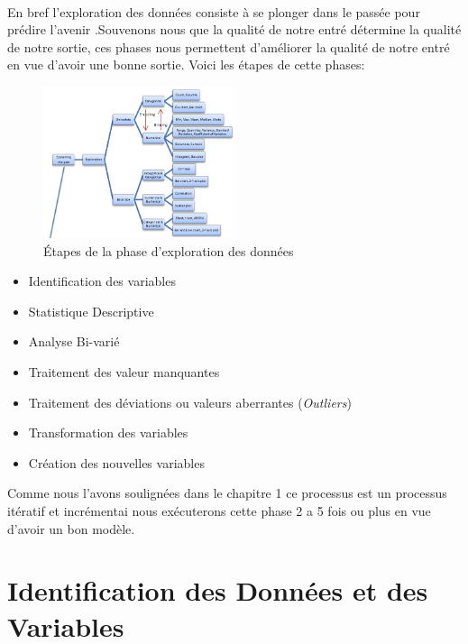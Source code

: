 \paragraph{}
En bref l'exploration des données consiste à se plonger dans le passée
pour prédire l'avenir .Souvenons nous que la qualité de notre entré
détermine la qualité de notre sortie, ces phases nous permettent
d'améliorer la qualité de notre entré en vue d'avoir une bonne sortie.
Voici les étapes de cette phases:
\begin{figure}[ht]
	\centering
	\includegraphics[width=0.5\textwidth]{fig/Exploration.png}
	\caption{Étapes de la phase d'exploration des données }
	\label{fig:imageExpSt}
\end{figure} 
\begin{itemize}
\item
  Identification des variables
\item
  Statistique Descriptive
\item
  Analyse Bi-varié
\item
  Traitement des valeur manquantes
\item
  Traitement des déviations  ou valeurs aberrantes (\emph{Outliers})  
\item
  Transformation des variables
\item
  Création des nouvelles variables
\end{itemize}
Comme nous l'avons soulignées dans le chapitre 1 ce processus est un
processus itératif et incrémentai nous exécuterons cette phase 2 a 5 fois ou plus en vue d'avoir un bon modèle.
\section{Identification des Données et des Variables}
